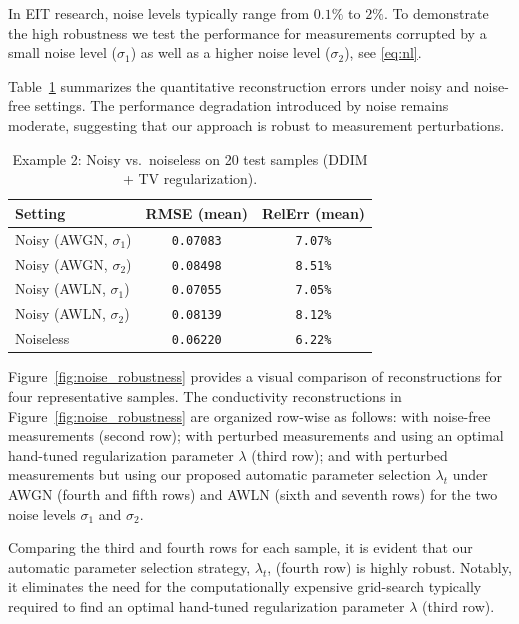 \documentclass[a4paper,11pt]{article}
\theoremstyle{definition}
\theoremstyle{plain}
\theoremstyle{remark}
\begin{document}
In EIT research, noise levels typically range from $0.1\%$ to $2\%$. To demonstrate the high robustness we test the performance for measurements corrupted by a small noise level ($\sigma_1$) as well as a higher noise level ($\sigma_2$), see \eqref{eq:nl}. 


Table~\ref{tab:noisy_w/o_noisy_20} summarizes the quantitative reconstruction errors under noisy and noise-free settings. The performance degradation introduced by noise remains moderate, suggesting that our approach is robust to measurement perturbations.

\begin{table}[H]
	\centering
	\caption{Example 2: Noisy vs.\ noiseless on 20 test samples (DDIM + TV regularization).}
	\label{tab:noisy_w/o_noisy_20}
	\begin{tabular}{lcc}
		\hline
		Setting & RMSE (mean)  & RelErr (mean) \\
		\hline
		Noisy (AWGN, $\sigma_1$) & \texttt{0.07083} & \texttt{7.07\%}  \\
        Noisy (AWGN, $\sigma_2$) & \texttt{0.08498} & \texttt{8.51\%}  \\
        Noisy (AWLN, $\sigma_1$) & \texttt{0.07055} & \texttt{7.05\%}  \\
        Noisy (AWLN, $\sigma_2$) & \texttt{0.08139} & \texttt{8.12\%}  \\
		Noiseless & \texttt{0.06220} &  \texttt{6.22\%}  \\
		\hline
	\end{tabular}
\end{table}

 Figure~\ref{fig:noise_robustness} provides a visual comparison of reconstructions for four representative samples. The conductivity reconstructions in Figure~\ref{fig:noise_robustness} are organized row-wise as follows: with noise-free measurements (second row); with perturbed measurements and using an optimal hand-tuned regularization parameter $\lambda$ (third row); and with perturbed measurements but using our proposed automatic parameter selection $\lambda_t$ under AWGN (fourth and fifth rows) and AWLN (sixth and seventh rows) for the two noise levels $\sigma_1$ and $\sigma_2$. 

Comparing the third and fourth rows for each sample, it is evident that our automatic parameter selection strategy, $\lambda_t$, (fourth row) is highly robust. Notably, it eliminates the need for the computationally expensive grid-search typically required to find an optimal hand-tuned regularization parameter $\lambda$ (third row).
\end{document}

